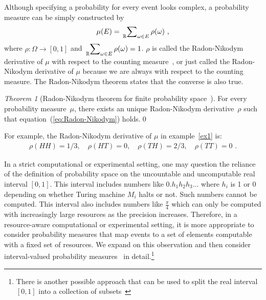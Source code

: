 \documentclass{article}
\theoremstyle{remark}
\newtheorem{thm}{Theorem}
\newcommand{\pmeas}{\ensuremath{\mu}}
\newcommand{\yutsung}[1]{\fbox{\begin{minipage}{0.9\textwidth}\color{purple}{Yu-Tsung says: #1}\end{minipage}}}
\newcommand{\amr}[1]{\fbox{\begin{minipage}{0.9\textwidth}\color{green}{Amr says: #1}\end{minipage}}}
\begin{document}
Although specifying a probability for every event looks complex, a
probability measure can be simply constructed by 
\begin{equation}
\pmeas(E)=\sideset{_{\mathbb{R}}}{_{\omega\in E}}\sum\rho(\omega)\textrm{ ,}\label{eq:Radon-Nikodym}
\end{equation}
where $\rho:\Omega\rightarrow[0,1]$ and $\sideset{_{\mathbb{R}}}{_{\omega\in E}}\sum\rho(\omega)=1$.
$\rho$ is called the Radon-Nikodym derivative of $\pmeas$ with respect
to the counting measure~\cite{Nikodym1930,Folland2013}, or just
called the Radon-Nikodym derivative of $\pmeas$ because we are always
with respect to the counting measure. The Radon-Nikodym theorem states
that the converse is also true.

\begin{thm}[Radon-Nikodym theorem for finite probability space~\cite{Kolmogorov1950,Swart2013}]
For every probability measure~$\pmeas$, there exists an unique Radon-Nikodym
derivative~$\rho$ such that equation~(\ref{eq:Radon-Nikodym})
holds.\qed\end{thm}

For example, the Radon-Nikodym derivative of $\pmeas$ in example~\ref{ex1}
is: 
\[
\begin{array}{rcl}
\rho\left(HH\right)=1/3,\quad\rho\left(HT\right)=0,\quad\rho\left(TH\right)=2/3,\quad\rho\left(TT\right)=0\textrm{ .}\end{array}
\]

In a strict computational or experimental setting, one may question
the reliance of the definition of probability space on the uncountable
and uncomputable real interval $[0,1]$. This interval includes numbers
like $0.h_{1}h_{2}h_{3}\ldots$ where $h_{i}$ is 1 or 0 depending
on whether Turing machine $M_{i}$ halts or not. Such numbers cannot
be computed. This interval also includes numbers like $\frac{\pi}{4}$
which can only be computed with increasingly large resources as the
precision increases. %
Therefore, in a resource-aware computational or experimental setting,
it is more appropriate to consider probability measures that map events
to a set of elements computable with a fixed set of resources. We
expand on this observation and then consider %
interval-valued probability measures~\cite{Weichselberger2000,JamisonLodwick2004}
in detail.\footnote{There is another possible approach that can be used to split the real
interval $[0,1]$ into a collection of subsets~\cite{PuriRalescu1983}
\amr{need to explain the connection and why we are not using it.}}
\end{document}
